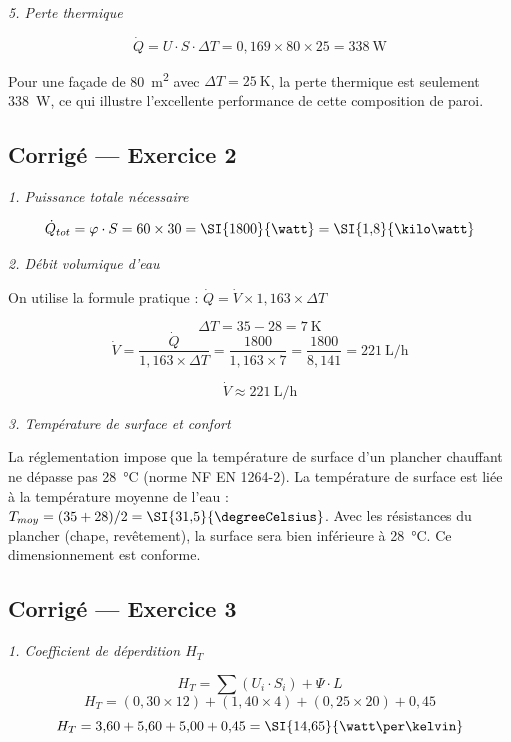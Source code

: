 \textit{5. Perte thermique}

\[
  \dot{Q} = U \cdot S \cdot \Delta T = 0{,}169 \times 80 \times 25 = \SI{338}{\watt}
\]

Pour une façade de \SI{80}{\meter\squared} avec \(\Delta T = \SI{25}{\kelvin}\), la perte
thermique est seulement \SI{338}{\watt}, ce qui illustre l'excellente performance de cette
composition de paroi.


\subsection*{Corrigé — Exercice 2}

\textit{1. Puissance totale nécessaire}

\[
  \dot{Q}_{tot} = \varphi \cdot S = 60 \times 30 = \SI{1800}{\watt} = \SI{1{,}8}{\kilo\watt}
\]

\textit{2. Débit volumique d'eau}

On utilise la formule pratique : \(\dot{Q} = \dot{V} \times 1{,}163 \times \Delta T\)

\[
  \Delta T = 35 - 28 = \SI{7}{\kelvin}
\]
\[
  \dot{V} = \frac{\dot{Q}}{1{,}163 \times \Delta T} = \frac{1800}{1{,}163 \times 7}
  = \frac{1800}{8{,}141} = \SI{221}{\liter\per\hour}
\]

\[
  \boxed{\dot{V} \approx \SI{221}{\liter\per\hour}}
\]

\textit{3. Température de surface et confort}

La réglementation impose que la température de surface d'un plancher chauffant ne dépasse pas
\SI{28}{\degreeCelsius} (norme NF EN 1264-2). La température de surface est liée à la
température moyenne de l'eau : \(T_{moy} = (35+28)/2 = \SI{31{,}5}{\degreeCelsius}\). Avec
les résistances du plancher (chape, revêtement), la surface sera bien inférieure à
\SI{28}{\degreeCelsius}. Ce dimensionnement est conforme.


\subsection*{Corrigé — Exercice 3}

\textit{1. Coefficient de déperdition \(H_T\)}

\[
  H_T = \sum (U_i \cdot S_i) + \Psi \cdot L
\]
\[
  H_T = (0{,}30 \times 12) + (1{,}40 \times 4) + (0{,}25 \times 20) + 0{,}45
\]
\[
  H_T = 3{,}60 + 5{,}60 + 5{,}00 + 0{,}45 = \SI{14{,}65}{\watt\per\kelvin}
\]

